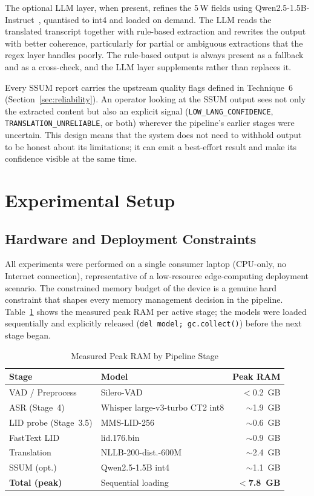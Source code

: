 \documentclass[conference]{IEEEtran}
\begin{document}
The optional LLM layer, when present, refines the 5\,W fields using Qwen2.5-1.5B-Instruct~\cite{qwen2025}, quantised to int4 and loaded on demand. The LLM reads the translated transcript together with rule-based extraction and rewrites the output with better coherence, particularly for partial or ambiguous extractions that the regex layer handles poorly. The rule-based output is always present as a fallback and as a cross-check, and the LLM layer supplements rather than replaces it.

Every SSUM report carries the upstream quality flags defined in Technique~6 (Section~\ref{sec:reliability}). An operator looking at the SSUM output sees not only the extracted content but also an explicit signal (\texttt{LOW\_LANG\_CONFIDENCE}, \texttt{TRANSLATION\_UNRELIABLE}, or both) wherever the pipeline's earlier stages were uncertain. This design means that the system does not need to withhold output to be honest about its limitations; it can emit a best-effort result and make its confidence visible at the same time.

\section{Experimental Setup}

\subsection{Hardware and Deployment Constraints}

All experiments were performed on a single consumer laptop (CPU-only, no Internet connection), representative of a low-resource edge-computing deployment scenario. The constrained memory budget of the device is a genuine hard constraint that shapes every memory management decision in the pipeline. Table~\ref{tab:memory} shows the measured peak RAM per active stage; the models were loaded sequentially and explicitly released (\texttt{del model; gc.collect()}) before the next stage began.

\begin{table}[htbp]
\caption{Measured Peak RAM by Pipeline Stage}
\label{tab:memory}
\begin{center}
\begin{tabular}{p{2.4cm}p{3.2cm}r}
\toprule
\textbf{Stage} & \textbf{Model} & \textbf{Peak RAM} \\
\midrule
VAD / Preprocess & Silero-VAD & $<$0.2~GB \\
ASR (Stage~4) & Whisper large-v3-turbo CT2 int8 & $\sim$1.9~GB \\
LID probe (Stage~3.5) & MMS-LID-256 & $\sim$0.6~GB \\
FastText LID & lid.176.bin & $\sim$0.9~GB \\
Translation & NLLB-200-dist.-600M & $\sim$2.4~GB \\
SSUM (opt.) & Qwen2.5-1.5B int4 & $\sim$1.1~GB \\
\midrule
\textbf{Total (peak)} & Sequential loading & \textbf{$<$7.8~GB} \\
\bottomrule
\end{tabular}
\end{center}
\end{table}
\end{document}
